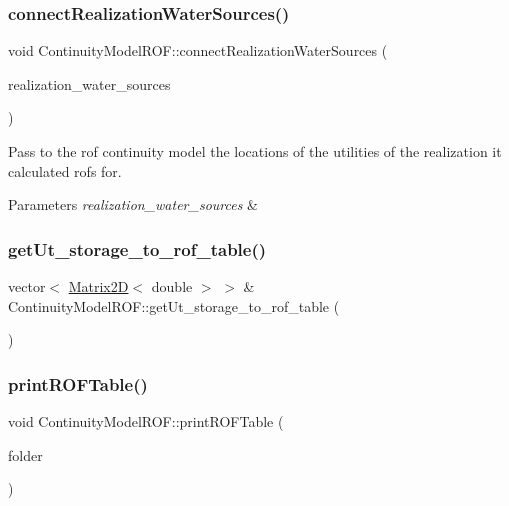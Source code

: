 \subsubsection{\texorpdfstring{connect\+Realization\+Water\+Sources()}{connectRealizationWaterSources()}}
{\footnotesize\ttfamily void Continuity\+Model\+R\+O\+F\+::connect\+Realization\+Water\+Sources (\begin{DoxyParamCaption}\item[{const vector$<$ \mbox{\hyperlink{classWaterSource}{Water\+Source}} $\ast$$>$ \&}]{realization\+\_\+water\+\_\+sources }\end{DoxyParamCaption})}

Pass to the rof continuity model the locations of the utilities of the realization it calculated rofs for. 
\begin{DoxyParams}{Parameters}
{\em realization\+\_\+water\+\_\+sources} & \\
\hline
\end{DoxyParams}
\mbox{\label{classContinuityModelROF_ab4a793f312b693d98c80e4b9545a8bb5}} 
\subsubsection{\texorpdfstring{get\+Ut\+\_\+storage\+\_\+to\+\_\+rof\+\_\+table()}{getUt\_storage\_to\_rof\_table()}}
{\footnotesize\ttfamily vector$<$ \mbox{\hyperlink{classMatrix2D}{Matrix2D}}$<$ double $>$ $>$ \& Continuity\+Model\+R\+O\+F\+::get\+Ut\+\_\+storage\+\_\+to\+\_\+rof\+\_\+table (\begin{DoxyParamCaption}{ }\end{DoxyParamCaption})}

\mbox{\label{classContinuityModelROF_a1bb8362ce39e694937a787805613e106}} 
\subsubsection{\texorpdfstring{print\+R\+O\+F\+Table()}{printROFTable()}}
{\footnotesize\ttfamily void Continuity\+Model\+R\+O\+F\+::print\+R\+O\+F\+Table (\begin{DoxyParamCaption}\item[{const string \&}]{folder }\end{DoxyParamCaption})}

